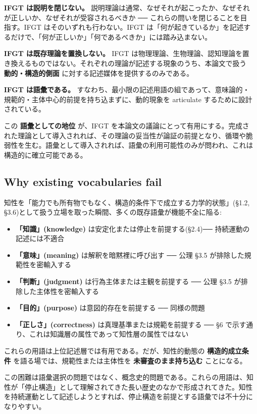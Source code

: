 \textbf{IFGT は説明を閉じない。} 説明理論は通常、なぜそれが起こったか、なぜそれが正しいか、なぜそれが受容されるべきか ── これらの問いを閉じることを目指す。IFGT はそのいずれも行わない。IFGT は「何が起きているか」を記述するだけで、「何が正しいか」「何であるべきか」には踏み込まない。

\textbf{IFGT は既存理論を置換しない。} IFGT は物理理論、生物理論、認知理論を置き換えるものではない。それぞれの理論が記述する現象のうち、本論文で扱う \textbf{動的・構造的側面} に対する記述媒体を提供するのみである。

\textbf{IFGT は語彙である。} すなわち、最小限の記述用語の組であって、意味論的・規範的・主体中心的前提を持ち込まずに、動的現象を articulate するために設計されている。

この \textbf{語彙としての地位} が、IFGT を本論文の議論にとって有用にする。完成された理論として導入されれば、その理論の妥当性が論証の前提となり、循環や脆弱性を生む。語彙として導入されれば、語彙の利用可能性のみが問われ、これは構造的に確立可能である。

\subsection{Why existing vocabularies fail}


知性を「能力でも所有物でもなく、構造的条件下で成立する力学的状態」(\S{}1.2, \S{}3.6)として扱う立場を取った瞬間、多くの既存語彙が機能不全に陥る:

\begin{itemize}
\item \textbf{「知識」(knowledge)} は安定化または停止を前提する(\S{}2.4)── 持続運動の記述には不適合
\item \textbf{「意味」(meaning)} は解釈を暗黙裡に呼び出す ── 公理 \S{}3.5 が排除した規範性を密輸入する
\item \textbf{「判断」(judgment)} は行為主体または主観を前提する ── 公理 \S{}3.5 が排除した主体性を密輸入する
\item \textbf{「目的」(purpose)} は意図的存在を前提する ── 同様の問題
\item \textbf{「正しさ」(correctness)} は真理基準または規範を前提する ── \S{}6 で示す通り、これは知識層の属性であって知性層の属性ではない
\end{itemize}

これらの用語は上位記述層では有用である。だが、知性的動態の \textbf{構造的成立条件} を語る場では、規範性または主体性を \textbf{未審査のまま持ち込む} ことになる。

この困難は語彙選択の問題ではなく、概念史的問題である。これらの用語は、知性が「停止構造」として理解されてきた長い歴史のなかで形成されてきた。知性を持続運動として記述しようとすれば、停止構造を前提とする語彙では不十分になりやすい。

